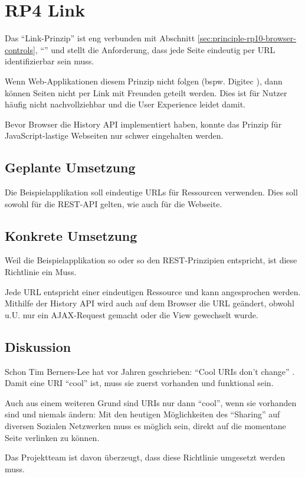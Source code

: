\section{RP4 Link}
\label{sec:principle-rp4-link}

Das ``Link-Prinzip'' ist eng verbunden mit Abschnitt \ref{sec:principle-rp10-browser-controls}, ``'' und stellt die Anforderung, dass jede Seite eindeutig per \gls{URL} identifizierbar sein muss.

Wenn Web-Applikationen diesem Prinzip nicht folgen (bspw. Digitec \cite{Digitec}), dann können Seiten nicht per Link mit Freunden geteilt werden.
Dies ist für Nutzer häufig nicht nachvollziehbar und die User Experience leidet damit.

Bevor Browser die History API \cite{HistoryAPI} implementiert haben, konnte das Prinzip für JavaScript-lastige Webseiten nur schwer eingehalten werden.

\subsection*{Geplante Umsetzung}
Die Beispielapplikation soll eindeutige URLs für Ressourcen verwenden. Dies soll sowohl für die REST-API gelten, wie auch für die Webseite.

\subsection*{Konkrete Umsetzung}
Weil die Beispielapplikation so oder so den \gls{REST}-Prinzipien entspricht, ist diese Richtlinie ein Muss.

Jede URL entspricht einer eindeutigen Ressource und kann angesprochen werden.
Mithilfe der History API \cite{HistoryAPI} wird auch auf dem Browser die URL
geändert, obwohl u.U. nur ein AJAX-Request gemacht oder die View gewechselt wurde.

\subsection*{Diskussion}
Schon Tim Berners-Lee hat vor Jahren geschrieben: ``Cool \glspl{URI} don't change'' \cite{CoolURIsTBL}.
Damit eine \gls{URI} ``cool'' ist, muss sie zuerst vorhanden und funktional sein.

Auch aus einem weiteren Grund sind \glspl{URI} nur dann ``cool'', wenn sie vorhanden sind
und niemals ändern: Mit den heutigen Möglichkeiten des ``Sharing'' auf diversen Sozialen
Netzwerken muss es möglich sein, direkt auf die momentane Seite verlinken zu können.

Das Projektteam ist davon überzeugt, dass diese Richtlinie umgesetzt werden muss.